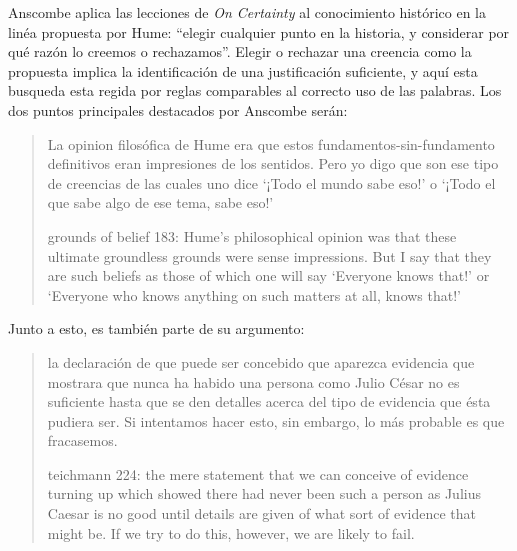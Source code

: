Anscombe aplica las lecciones de \emph{On Certainty} al conocimiento histórico
en la linéa propuesta por Hume: ``elegir cualquier punto en la historia, y
considerar por qué razón lo creemos o rechazamos''. Elegir o rechazar una
creencia como la propuesta implica la identificación de una justificación
suficiente, y aquí esta busqueda esta regida por reglas comparables al correcto
uso de las palabras. Los dos puntos principales destacados por Anscombe serán:
\blockquote[grounds of belief 183: Hume's philosophical opinion was that these
ultimate groundless grounds were sense impressions. But I say that they are such
beliefs as those of which one will say `Everyone knows that!' or `Everyone who
knows anything on such matters at all, knows that!']{La opinion filosófica de
  Hume era que estos fundamentos-sin-fundamento definitivos eran impresiones de
  los sentidos. Pero yo digo que son ese tipo de creencias de las cuales uno
  dice `¡Todo el mundo sabe eso!' o `¡Todo el que sabe algo de ese tema, sabe
  eso!'}. Junto a esto, es también parte de su argumento:
\blockquote[teichmann 224: the mere statement that we can conceive of evidence
turning up which showed there had never been such a person as Julius Caesar is
no good until details are given of what sort of evidence that might be. If we
try to do this, however, we are likely to fail.]{la declaración de que puede ser
  concebido que aparezca evidencia que mostrara que nunca ha habido una persona
  como Julio César no es suficiente hasta que se den detalles acerca del tipo de
  evidencia que ésta pudiera ser. Si intentamos hacer esto, sin embargo, lo más
  probable es que fracasemos.}

